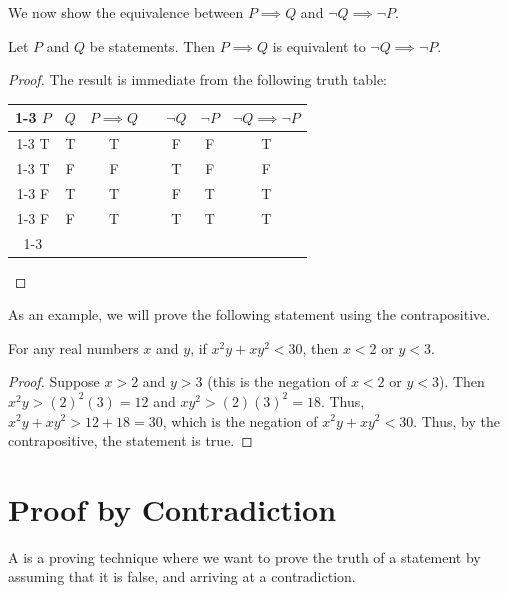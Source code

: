 We now show the equivalence between $P \implies Q$ and $\lnot Q \implies \lnot P$.

\begin{proposition}
    Let $P$ and $Q$ be statements. Then $P \implies Q$ is equivalent to $\lnot Q \implies \lnot P$.
\end{proposition}
\begin{proof}
    The result is immediate from the following truth table:

    \begin{table}[H]
        \centering
        \begin{tabular}{|c|c|c|l|c|c|c|}
        \cline{1-3} \cline{5-7}
        $P$ & $Q$ & $P \implies Q$ &  & $\lnot Q$ & $\lnot P$ & $\lnot Q \implies \lnot P$ \\ \cline{1-3} \cline{5-7} 
        T & T & T &  & F & F & T \\ \cline{1-3} \cline{5-7} 
        T & F & F &  & T & F & F \\ \cline{1-3} \cline{5-7} 
        F & T & T &  & F & T & T \\ \cline{1-3} \cline{5-7} 
        F & F & T &  & T & T & T \\ \cline{1-3} \cline{5-7} 
        \end{tabular}
    \end{table}
\end{proof}

As an example, we will prove the following statement using the contrapositive.

\begin{statement}
    For any real numbers $x$ and $y$, if $x^2 y + x y^2 < 30$, then $x < 2$ or $y < 3$.
\end{statement}
\begin{proof}
    Suppose $x > 2$ and $y > 3$ (this is the negation of $x < 2$ or $y < 3$). Then $x^2 y > (2)^2 (3) = 12$ and $xy^2 > (2)(3)^2 = 18$. Thus, $x^2 y + xy^2 > 12 + 18 = 30$, which is the negation of $x^2y + xy^2 < 30$. Thus, by the contrapositive, the statement is true.
\end{proof}

\section{Proof by Contradiction}

A  is a proving technique where we want to prove the truth of a statement by assuming that it is false, and arriving at a contradiction.

